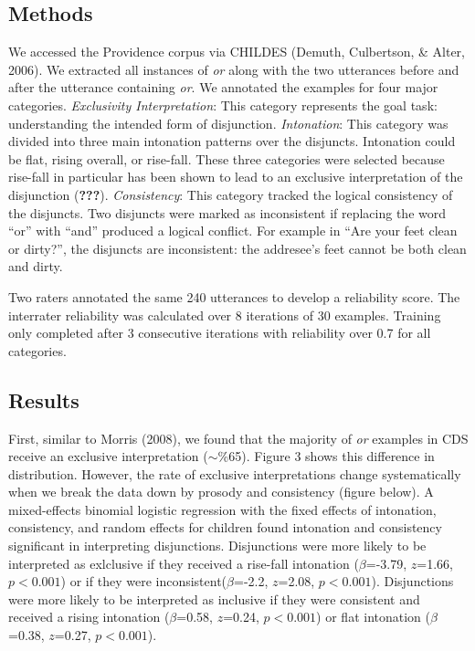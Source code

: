 \documentclass[10pt, letterpaper]{article}
\begin{document}
\subsection{Methods}\label{methods-1}

We accessed the Providence corpus via CHILDES (Demuth, Culbertson, \&
Alter, 2006). We extracted all instances of \emph{or} along with the two
utterances before and after the utterance containing \emph{or}. We
annotated the examples for four major categories. \emph{Exclusivity
Interpretation}: This category represents the goal task: understanding
the intended form of disjunction. \emph{Intonation}: This category was
divided into three main intonation patterns over the disjuncts.
Intonation could be flat, rising overall, or rise-fall. These three
categories were selected because rise-fall in particular has been shown
to lead to an exclusive interpretation of the disjunction
({\textbf{???}}). \emph{Consistency}: This category tracked the logical
consistency of the disjuncts. Two disjuncts were marked as inconsistent
if replacing the word ``or'' with ``and'' produced a logical conflict.
For example in ``Are your feet clean or dirty?'', the disjuncts are
inconsistent: the addresee's feet cannot be both clean and dirty.

Two raters annotated the same 240 utterances to develop a reliability
score. The interrater reliability was calculated over 8 iterations of 30
examples. Training only completed after 3 consecutive iterations with
reliability over 0.7 for all categories.

\subsection{Results}\label{results-1}

First, similar to Morris (2008), we found that the majority of \emph{or}
examples in CDS receive an exclusive interpretation (\(\sim\)\%65).
Figure 3 shows this difference in distribution. However, the rate of
exclusive interpretations change systematically when we break the data
down by prosody and consistency (figure below). A mixed-effects binomial
logistic regression with the fixed effects of intonation, consistency,
and random effects for children found intonation and consistency
significant in interpreting disjunctions. Disjunctions were more likely
to be interpreted as exlclusive if they received a rise-fall intonation
(\(\beta\)=-3.79, \(z\)=1.66, \(p < 0.001\)) or if they were
inconsistent(\(\beta\)=-2.2, \(z\)=2.08, \(p < 0.001\)). Disjunctions
were more likely to be interpreted as inclusive if they were consistent
and received a rising intonation (\(\beta\)=0.58, \(z\)=0.24,
\(p < 0.001\)) or flat intonation (\(\beta\)=0.38, \(z\)=0.27,
\(p < 0.001\)).
\end{document}
